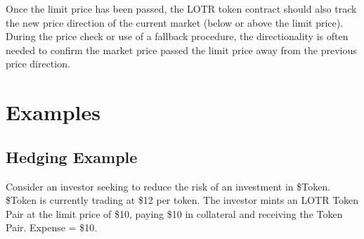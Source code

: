 \documentclass[12pt]{article}
\begin{document}
            Once the limit price has been passed, the LOTR token contract should also track the new price direction of the current market (below or above the limit price). During the price check or use of a fallback procedure, the directionality is often needed to confirm the market price passed the limit price away from the previous price direction.

   \section{Examples}
      \subsection{Hedging Example}
         Consider an investor seeking to reduce the risk of an investment in \$Token. \$Token is currently trading at \$12 per token. The investor mints an LOTR Token Pair at the limit price of \$10, paying \$10 in collateral and receiving the Token Pair. Expense = \$10.
\end{document}
